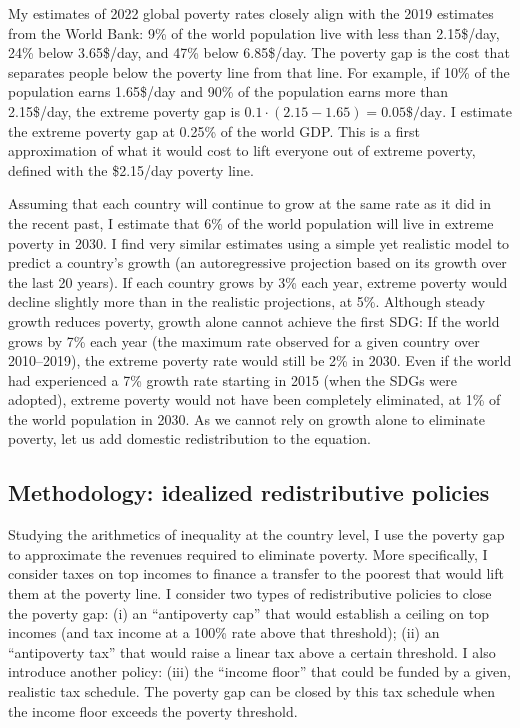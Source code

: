 

My estimates of 2022 global poverty rates closely align with the 2019 estimates from the World Bank: 9\% of the world population live with less than 2.15\$/day, 24\% below 3.65\$/day, and 47\% below 6.85\$/day. 
The poverty gap is the cost that separates people below the poverty line from that line. For example, if 10\% of the population earns 1.65\$/day and 90\% of the population earns more than 2.15\$/day, the extreme poverty gap is $0.1 \cdot (2.15 - 1.65) = 0.05\$/\text{day}$. %
I estimate the extreme poverty gap at 0.25\% of the world GDP. This is a first approximation of what it would cost to lift everyone out of extreme poverty, defined with the \$2.15/day poverty line. 

Assuming that each country will continue to grow at the same rate as it did in the recent past, %
I estimate that 6\% of the world population will live in extreme poverty in 2030. I find very similar estimates using a simple yet realistic model to predict a country's growth (an autoregressive projection based on its growth over the last 20 years). 
If each country grows by 3\% each year, extreme poverty would decline slightly more than in the realistic projections, at 5\%. 
Although steady growth reduces poverty, growth alone cannot achieve the first SDG: If the world grows by 7\% each year (the maximum rate observed for a given country over 2010--2019), %
the extreme poverty rate would still be 2\% in 2030. Even if the world had experienced a 7\% growth rate starting in 2015 (when the SDGs were adopted), extreme poverty would not have been completely eliminated, at 1\% of the world population in 2030. 
As we cannot rely on growth alone to eliminate poverty, let us add domestic redistribution to the equation. 

\subsection{Methodology: idealized redistributive policies}

Studying the arithmetics of inequality at the country level, I use the poverty gap to approximate the revenues required to eliminate poverty. 
More specifically, I consider taxes on top incomes to finance a transfer to the poorest that would lift them at the poverty line. I consider two types of redistributive policies to close the poverty gap: (i) an ``antipoverty cap'' that would establish a ceiling on top incomes (and tax income at a 100\% rate above that threshold); (ii) an ``antipoverty tax'' that would raise a linear tax above a certain threshold. I also introduce another policy: (iii) the ``income floor'' that could be funded by a given, realistic tax schedule. The poverty gap can be closed by this tax schedule when the income floor exceeds the poverty threshold.

